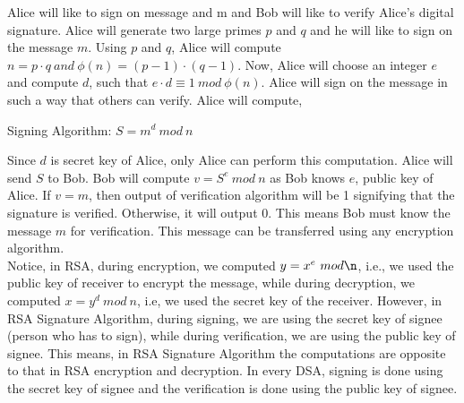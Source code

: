 \documentclass[11pt]{article}
\begin{document}
Alice will like to sign on message and m and Bob will like to verify Alice's digital signature. Alice will generate two large primes $p$ and $q$ and he will like to sign on the message $m$. Using $p$ and $q$, Alice will compute $n = p \cdot q \ and \ \phi(n) = (p-1) \cdot (q-1)$. Now, Alice will choose an integer $e$ and compute $d$, such that $e \cdot d \equiv 1 \ mod \ \phi(n)$. Alice will sign on the message in such a way that others can verify. Alice will compute,
\begin{center}
    Signing Algorithm: $S = m^d \ mod \ n$
\end{center}
Since $d$ is secret key of Alice, only Alice can perform this computation. Alice will send $S$ to Bob. Bob will compute $v = S^e \ mod \ n$ as Bob knows $e$, public key of Alice. If $v = m$, then output of verification algorithm will be 1 signifying that the signature is verified. Otherwise, it will output 0. This means Bob must know the message $m$ for verification. This message can be transferred using any encryption algorithm.\\
\newline
Notice, in RSA, during encryption, we computed $y = x^e \ mod \n$, i.e., we used the public key of receiver to encrypt the message, while during decryption, we computed $x = y^d \ mod \ n$, i.e, we used the secret key of the receiver. However, in RSA Signature Algorithm, during signing, we are using the secret key of signee (person who has to sign), while during verification, we are using the public key of signee. This means, in RSA Signature Algorithm the computations are opposite to that in RSA encryption and decryption. In every DSA, signing is done using the secret key of signee and the verification is done using the public key of signee.\\
\newline
\end{document}
